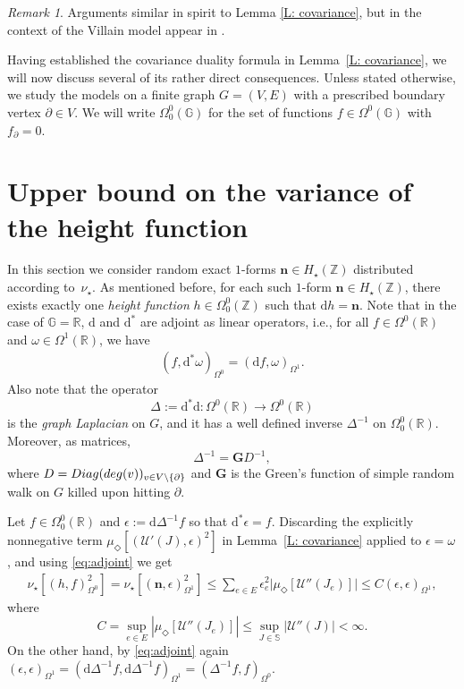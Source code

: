 \documentclass[11pt, reqno]{amsart}
\numberwithin{equation}{section}
\theoremstyle{definition}
\theoremstyle{remark}
\newtheorem{remark}{Remark}
\renewcommand{\d}{\mathrm{d}}
\renewcommand{\c}[1]{\ensuremath{\mathcal{#1}}}
\newcommand{\Green}{\ensuremath{\mathbf{G}}}
\newcommand{\J}{J}
\newcommand{\n}{\mathbf{n}}
\newcommand{\exact}{\star}
\newcommand{\coclosed}{\Diamond}
\newcommand{\Hcycle}{\ensuremath{H_{\star}}}
\begin{document}
\begin{remark} 
		Arguments similar in spirit to Lemma \ref{L: covariance}, but in the context of the Villain model appear in \cite{GaSe}. 
\end{remark}

Having established the covariance duality formula in Lemma~\ref{L: covariance}, we will now discuss several of its rather direct consequences. 
Unless stated otherwise, we study the models on a finite graph $G = (V,E)$ with a prescribed boundary vertex $\partial \in V$.
We will write $ \Omega_0^0(\mathbb G)$ for the set of functions $f\in \Omega^0(\mathbb G)$ with $f_\partial =0$.


\section{Upper bound on the variance of the height function} \label{sec:upperbound}
In this section we consider random {exact} $1$-forms $\n \in \Hcycle(\mathbb Z) $ distributed according to~$\nu_\exact$. As mentioned before, for each such $1$-form $\n\in \Hcycle(\mathbb Z)$, there exists exactly one \emph{height function} $h\in \Omega_0^0(\mathbb Z)$ such that $ \d h =\n $.
Note that in the case of $\mathbb G=\mathbb R$, $\d$ and $\d^*$ are adjoint as linear operators, i.e., for all 
$f\in \Omega^0(\mathbb R)$ and $\omega\in\Omega^1(\mathbb R)$, we have
\begin{align} \label{eq:adjoint}
(f, \d^* \omega)_{\Omega^0} = (\d f,\omega)_{\Omega^1}.
\end{align}
Also note that the operator 
\[
\Delta:=\d^*\d: \Omega^0(\mathbb R) \to \Omega^0(\mathbb R)
\] 
is the \emph{graph Laplacian} on $G$, and it has a well defined inverse $\Delta^{-1}$ on $\Omega^0_0(\mathbb R)$. Moreover, as matrices,
\[
\Delta^{-1} =  \Green D^{-1},
\]
where $D=\textnormal{Diag}(\textnormal{deg}(v))_{v\in V\setminus \{ \partial\}}$ and $\Green$ is the Green's function of simple random walk on $G$ killed upon hitting $\partial$.

Let $f \in  \Omega^0_0(\mathbb R)$ and $\epsilon :=\d \Delta^{-1}f$ so that $\d^*\epsilon =f$. Discarding the explicitly nonnegative term $\mu_{\coclosed} [(\c{U}'(\J), \epsilon)^2]$ in Lemma~\ref{L: covariance} applied to $\epsilon=\omega$, and using \eqref{eq:adjoint} we get
\begin{align} \label{eq:upperbound}
	\nu_{ \exact}[(h, f)_{\Omega^0}^2] =\nu_{ \exact}[(\n, \epsilon)_{\Omega^1}^2] \leq \sum_{e \in  E} \epsilon_{e}^2 \big|\mu_{\coclosed}[\mathcal U''(\J_e) ]\big|  \leq C (\epsilon, \epsilon)_{\Omega^1},
\end{align}
where 
\[
C=\sup_{e\in E} |\mu_{\coclosed}[\mathcal U''(\J_e)]| \leq \sup_{J\in \mathbb S} |\mathcal U''(J)|<\infty.
\] 
On the other hand, by \eqref{eq:adjoint} again	$(\epsilon, \epsilon)_{\Omega^1}= (\d \Delta^{-1}f,\d \Delta^{-1}f)_{\Omega^1}=  ( \Delta^{-1}f,f)_{\Omega^0}$.
\end{document}
